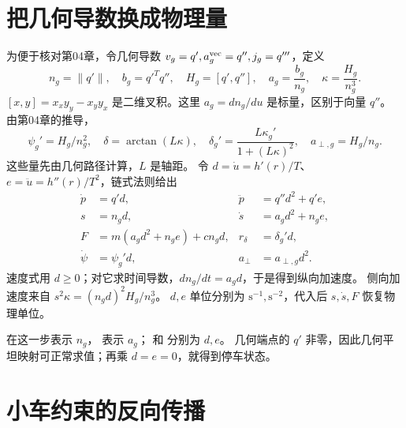 \section{把几何导数换成物理量}
为便于核对第04章，令几何导数 $v_g=q',a_g^{\rm vec}=q'',j_g=q'''$，定义
\[
 n_g=\|q'\|,\quad b_g=q'^Tq'',\quad H_g=[q',q''],\quad
 a_g=\frac{b_g}{n_g},\quad \kappa=\frac{H_g}{n_g^3}.
\]
$[x,y]=x_xy_y-x_yy_x$ 是二维叉积。这里 $a_g=dn_g/du$ 是标量，区别于向量 $q''$。
由第04章的推导，
\[
 \psi_g'=H_g/n_g^2,\quad \delta=\arctan(L\kappa),\quad
 \delta_g'=\frac{L\kappa_g'}{1+(L\kappa)^2},\quad
 a_{\perp,g}=H_g/n_g.
\]
这些量先由几何路径计算，$L$ 是轴距。
令 $d=\dot u=h'(r)/T$、$e=\ddot u=h''(r)/T^2$，链式法则给出
\begin{align}
 \dot p&=q'd,& \ddot p&=q''d^2+q'e,\\
 s&=n_gd,& \dot s&=a_gd^2+n_ge,\\
 F&=m(a_gd^2+n_ge)+cn_gd,& r_\delta&=\delta_g'd,\\
 \dot\psi&=\psi_g'd,& a_\perp&=a_{\perp,g}d^2.
 \label{eq:ack-warp}
\end{align}
速度式用 $d\ge0$；对它求时间导数，$dn_g/dt=a_gd$，于是得到纵向加速度。
侧向加速度来自 $s^2\kappa=(n_gd)^2H_g/n_g^3$。
$d,e$ 单位分别为 $\mathrm{s^{-1}},\mathrm{s^{-2}}$，代入后 $s,\dot s,F$ 恢复物理单位。
\par\noindent\begin{minipage}{\linewidth}

\end{minipage}\par
{} 在这一步表示 $n_g$， 表示 $a_g$；
 和  分别为 $d,e$。
几何端点的 $q'$ 非零，因此几何平坦映射可正常求值；再乘 $d=e=0$，就得到停车状态。

\section{小车约束的反向传播}
